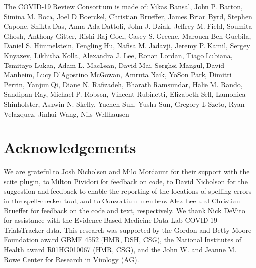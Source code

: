 \documentclass[twocolumn]{ceurart}
\begin{document}
The COVID-19 Review Consortium is made of:
Vikas Bansal, John P. Barton, Simina M. Boca, Joel D Boerckel, Christian Brueffer, James Brian Byrd, Stephen Capone, Shikta Das, Anna Ada Dattoli, John J. Dziak, Jeffrey M. Field, Soumita Ghosh, Anthony Gitter, Rishi Raj Goel, Casey S. Greene, Marouen Ben Guebila, Daniel S. Himmelstein, Fengling Hu, Nafisa M. Jadavji, Jeremy P. Kamil, Sergey Knyazev, Likhitha Kolla, Alexandra J. Lee, Ronan Lordan, Tiago Lubiana, Temitayo Lukan, Adam L. MacLean, David Mai, Serghei Mangul, David Manheim, Lucy D'Agostino McGowan, Amruta Naik, YoSon Park, Dimitri Perrin, Yanjun Qi, Diane N. Rafizadeh, Bharath Ramsundar, Halie M. Rando, Sandipan Ray, Michael P. Robson, Vincent Rubinetti, Elizabeth Sell, Lamonica Shinholster, Ashwin N. Skelly, Yuchen Sun, Yusha Sun, Gregory L Szeto, Ryan Velazquez, Jinhui Wang, Nils Wellhausen

\hypertarget{acknowledgements}{%
\section*{Acknowledgements}\label{acknowledgements}}

We are grateful to Josh Nicholson and Milo Mordaunt for their support with the scite plugin, to Milton Pividori for feedback on code, to David Nicholson for the suggestion and feedback to enable the reporting of the locations of spelling errors in the spell-checker tool, and to Consortium members Alex Lee and Christian Brueffer for feedback on the code and text, respectively.
We thank Nick DeVito for assistance with the Evidence-Based Medicine Data Lab COVID-19 TrialsTracker data.
This research was supported by the Gordon and Betty Moore Foundation award GBMF 4552 (HMR, DSH, CSG), the National Institutes of Health award R01HG010067 (HMR, CSG), and the John W. and Jeanne M. Rowe Center for Research in Virology (AG).



\end{document}
